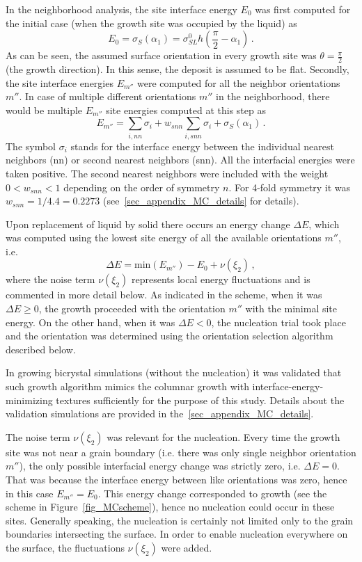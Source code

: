 In the neighborhood analysis, the site interface energy $E_0$ was first computed for the initial case (when the growth site was occupied by the liquid) as
\begin{equation}
	E_0 = \sigma_S(\alpha_1) = \sigma_{SL}^0\textstyle h\left(\frac{\pi}{2}-\alpha_1\right) \,.
\end{equation}
As can be seen, the assumed surface orientation in every growth site was $\theta=\textstyle\frac{\pi}{2}$ (the growth direction). In this sense, the deposit is assumed to be flat. Secondly, the site interface energies $E_{m''}$ were computed for all the neighbor orientations $m''$. In case of multiple different orientations $m''$ in the neighborhood, there would be multiple $E_{m''}$ site energies computed at this step as
\begin{equation}\label{eq_MC_local_energy}
	E_{m''} = \sum_{i, nn}\sigma_i + w_{snn}\sum_{i, snn}\sigma_i + \sigma_S(\alpha_1)  \,.
\end{equation}
The symbol $\sigma_i$ stands for the interface energy between the individual nearest neighbors (nn) or second nearest neighbors (snn). All the interfacial energies were taken positive. The second nearest neighbors were included with the weight $0<w_{snn}<1$ depending on the order of symmetry $n$. For 4-fold symmetry it was $w_{snn}=1/4.4=0.2273$ (see~\ref{sec_appendix_MC_details} for details).

Upon replacement of liquid by solid there occurs an energy change $\Delta E$, which was computed using the lowest site energy of all the available orientations $m''$, i.e.
\begin{equation}
	\Delta E = \mathrm{min}(E_{m''})-E_0 + \nu(\xi_2)\,,
\end{equation}
where the noise term $\nu(\xi_2)$ represents local energy fluctuations and is commented in more detail below. As indicated in the scheme, when it was $\Delta E\geq 0$, the growth proceeded with the orientation $m''$ with the minimal site energy. On the other hand, when it was $\Delta E < 0$, the nucleation trial took place and the orientation was determined using the orientation selection algorithm described below. 

In growing bicrystal simulations (without the nucleation) it was validated that such growth algorithm mimics the columnar growth with interface-energy-minimizing textures sufficiently for the purpose of this study. Details about the validation simulations are provided in the~\ref{sec_appendix_MC_details}.

The noise term $\nu(\xi_2)$ was relevant for the nucleation. Every time the growth site was not near a grain boundary (i.e. there was only single neighbor orientation $m''$), the only possible interfacial energy change was strictly zero, i.e. $\Delta E=0$. That was because the interface energy between like orientations was zero, hence in this case $E_{m''}=E_0$. This energy change corresponded to growth (see the scheme in Figure~\ref{fig_MCscheme}), hence no nucleation could occur in these sites. Generally speaking, the nucleation is certainly not limited only to the grain boundaries intersecting the surface. In order to enable nucleation everywhere on the surface, the fluctuations $\nu(\xi_2)$ were added.

